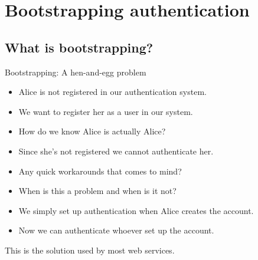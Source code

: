 \mode*




\section[Bootstrapping]{Bootstrapping authentication}

\subsection{What is bootstrapping?}

\begin{frame}
  \begin{block}{Bootstrapping: A hen-and-egg problem}
    \begin{itemize}
      \item Alice is not registered in our authentication system.
      \item We want to register her as a user in our system.

        \pause{}

      \item How do we know Alice is actually Alice?
      \item Since she's not registered we cannot authenticate her.
    \end{itemize}
  \end{block}

  \pause{}

  \begin{exercise}
    \begin{itemize}
      \item Any quick workarounds that comes to mind?
      \item When is this a problem and when is it not?
    \end{itemize}
  \end{exercise}
\end{frame}

\begin{frame}
  \begin{solution}
    \begin{itemize}
      \item We simply set up authentication when Alice creates the account.
      \item Now we can authenticate whoever set up the account.
    \end{itemize}
  \end{solution}

  \pause{}

  \begin{example}
    This is the solution used by most web services.
  \end{example}
\end{frame}

